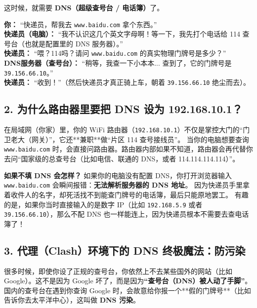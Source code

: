 \documentclass[12pt,a4paper]{ctexart}
\begin{document}
这时候，就需要 \textbf{DNS（超级查号台 / 电话簿）}了。

\begin{tcolorbox}[colback=purple!5,colframe=purple!75!black,title=DNS 的工作流程,fonttitle=\bfseries,boxrule=0.5pt,arc=3mm]
\textbf{你：} “快递员，帮我去 \texttt{www.baidu.com} 拿个东西。” \\
\textbf{快递员（电脑）：} “我不认识这几个英文字母啊！等一下，我先打个电话给 114 查号台（也就是配置里的 DNS 服务器）。” \\
\textbf{快递员：} “喂？114吗？请问 \texttt{www.baidu.com} 的真实物理门牌号是多少？” \\
\textbf{DNS服务器（查号台）：} “稍等，我查一下小本本... 查到了，它的门牌号是 \texttt{39.156.66.10}。” \\
\textbf{快递员：} “收到！”（然后快递员才真正骑上车，朝着 \texttt{39.156.66.10} 绝尘而去）。
\end{tcolorbox}

\subsection{2. 为什么路由器里要把 DNS 设为 192.168.10.1？}

在局域网（你家）里，你的 WiFi 路由器（\texttt{192.168.10.1}）不仅是掌控大门的“门卫老大（网关）”，它还**兼职**做“片区 114 查号接线员”。
当你的电脑想要查询 \texttt{www.baidu.com} 时，会直接问路由器。路由器内部如果不知道，路由器会再代替你去问“国家级的总查号台（比如电信、联通的 DNS，或者 114.114.114.114）”。

\textbf{如果不填 DNS 会怎样？}
如果你的电脑没有配置 DNS，你打开浏览器输入 \texttt{www.baidu.com} 会瞬间报错：\textbf{无法解析服务器的 DNS 地址}。
因为快递员手里拿着收件人的名字，却死活找不到能查门牌号的电话簿，最后只能原地罢工。
有趣的是，如果你当时直接输入的是数字 IP（比如 \texttt{192.168.5.9} 或者 \texttt{39.156.66.10}），那么不配 DNS 也一样能连上，因为快递员根本不需要去查电话簿了！

\subsection{3. 代理（Clash）环境下的 DNS 终极魔法：防污染}

很多时候，即使你设了正规的查号台，你依然上不去某些国外的网站（比如 Google）。这不是因为 Google 坏了，而是因为\textbf{“查号台（DNS）被人动了手脚”}。
国内的查号台在遇到你查询 Google 时，会故意给你报一个**假的门牌号**（比如告诉你去太平洋中心），这叫做 \textbf{DNS 污染}。
\end{document}
